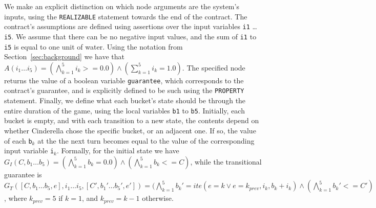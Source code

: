 We make an explicit distinction on which node arguments are the system's inputs, using the \texttt{REALIZABLE} statement towards the end of the contract. The contract's
assumptions are defined using assertions over the input variables
\texttt{i1} \ldots \texttt{i5}. We assume that there can be no negative input values, and the
sum of \texttt{i1} to \texttt{i5} is equal to one unit of water. Using the notation from Section~\ref{sec:background} we have that $A(i_1 \ldots i_5) = (\bigwedge_{k=1}^{5} i_k >= 0.0) \land (\sum_{k=1}^{5} i_{k} = 1.0)$. The specified node
returns the value of a boolean variable \texttt{guarantee}, which corresponds to
the contract's guarantee, and is explicitly defined to be such using the
\texttt{PROPERTY} statement. Finally, we define what each bucket's state should be through the entire
duration of the game, using the local variables \texttt{b1} to \texttt{b5}.
Initially, each bucket is empty, and with each transition to a new state, the contents depend on
whether Cinderella chose the specific bucket, or an adjacent one. If so, the value of each \texttt{b}$_k$ at the the next turn becomes equal to the value of the corresponding input variable \texttt{i}$_k$. Formally, for the initial state we have $G_{I}(C, b_1 \ldots b_5) = (\bigwedge_{k=1}^{5} b_k = 0.0) \land (\bigwedge_{k = 1}^{5} b_k <= C)$, while the transitional guarantee is $G_T([C,b_1 \ldots b_5,e], i_1 \ldots i_5, [C',b_{1}' \ldots b_{5}',e']) = (\bigwedge_{k=1}^{5} b_{k}' = ite(e = k \lor e = k_{prev}, i_k, b_k + i_k) \land (\bigwedge_{k=1}^{5} b_{k}' <= C')$, where $k_{prev} = 5$ if $k = 1$, and $k_{prev} = k - 1$ otherwise.

